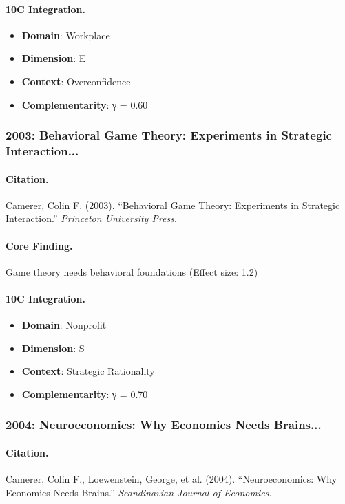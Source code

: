 \paragraph{10C Integration.}
\begin{itemize}[nosep]
  \item \textbf{Domain}: Workplace
  \item \textbf{Dimension}: E
  \item \textbf{Context}: Overconfidence
  \item \textbf{Complementarity}: γ = 0.60
\end{itemize}

\subsubsection{2003: Behavioral Game Theory: Experiments in Strategic Interaction...}

\paragraph{Citation.}
Camerer, Colin F. (2003). ``Behavioral Game Theory: Experiments in Strategic Interaction.''
\textit{Princeton University Press}.

\paragraph{Core Finding.}
Game theory needs behavioral foundations (Effect size: 1.2)

\paragraph{10C Integration.}
\begin{itemize}[nosep]
  \item \textbf{Domain}: Nonprofit
  \item \textbf{Dimension}: S
  \item \textbf{Context}: Strategic Rationality
  \item \textbf{Complementarity}: γ = 0.70
\end{itemize}

\subsubsection{2004: Neuroeconomics: Why Economics Needs Brains...}

\paragraph{Citation.}
Camerer, Colin F., Loewenstein, George, et al. (2004). ``Neuroeconomics: Why Economics Needs Brains.''
\textit{Scandinavian Journal of Economics}.

